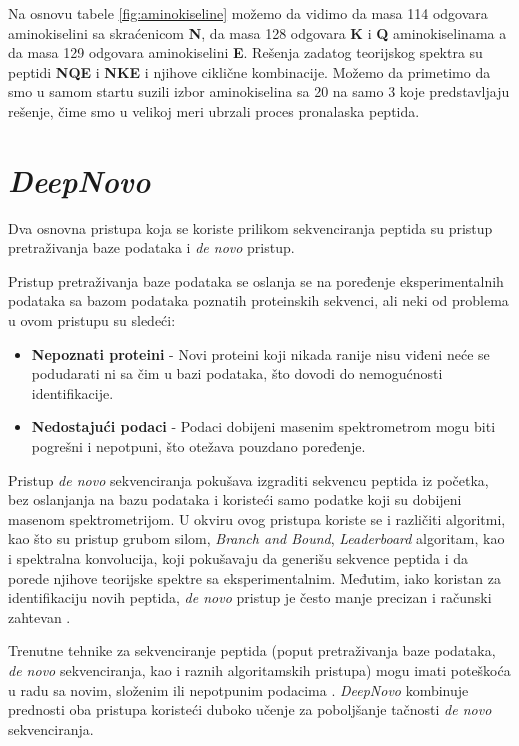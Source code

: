 \documentclass[12pt,oneside]{memoir}
\begin{document}
Na osnovu tabele \ref{fig:aminokiseline} možemo da vidimo da masa 114 odgovara aminokiselini sa skraćenicom \textbf{N}, da masa 128 odgovara \textbf{K} i \textbf{Q} aminokiselinama a da masa 129 odgovara aminokiselini \textbf{E}.
Rešenja zadatog teorijskog spektra su peptidi \textbf{NQE} i \textbf{NKE} i njihove ciklične kombinacije. Možemo da primetimo da smo u samom startu suzili izbor aminokiselina sa 20 na samo 3 koje predstavljaju rešenje, čime smo u velikoj meri ubrzali proces pronalaska peptida.

\section{\emph{DeepNovo}}

Dva osnovna pristupa koja se koriste prilikom sekvenciranja peptida su pristup pretraživanja baze podataka i \textit{de novo} pristup.

Pristup pretraživanja baze podataka se oslanja se na poređenje eksperimentalnih podataka sa bazom podataka poznatih proteinskih sekvenci, ali neki od problema u ovom pristupu su sledeći:

\begin{itemize}
    \item \textbf{Nepoznati proteini} - Novi proteini koji nikada ranije nisu viđeni neće se podudarati ni sa čim u bazi podataka, što dovodi do nemogućnosti identifikacije.
    \item \textbf{Nedostajući podaci} - Podaci dobijeni masenim spektrometrom mogu biti pogrešni i nepotpuni, što otežava pouzdano poređenje.
\end{itemize}

Pristup \emph{de novo} sekvenciranja pokušava izgraditi sekvencu peptida iz početka, bez oslanjanja na bazu podataka i koristeći samo podatke koji su dobijeni masenom spektrometrijom. U okviru ovog pristupa koriste se i različiti algoritmi, kao što su pristup grubom silom, \emph{Branch and Bound}, \emph{Leaderboard} algoritam, kao i spektralna konvolucija, koji pokušavaju da generišu sekvence peptida i da porede njihove teorijske spektre sa eksperimentalnim. Međutim, iako koristan za identifikaciju novih peptida, \emph{de novo} pristup je često manje precizan i računski zahtevan \cite{deepnovo}. 

Trenutne tehnike za sekvenciranje peptida (poput pretraživanja baze podataka, \emph{de novo} sekvenciranja, kao i raznih algoritamskih pristupa) mogu imati poteškoća u radu sa novim, složenim ili nepotpunim podacima \cite{deepnovo}. \emph{DeepNovo} kombinuje prednosti oba pristupa koristeći duboko učenje za poboljšanje tačnosti \emph{de novo} sekvenciranja.
\end{document}
